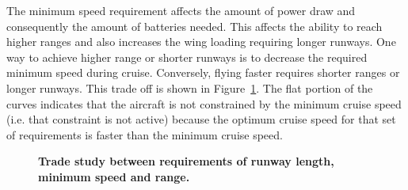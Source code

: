 \documentclass[]{aiaa-tc}%
\begin{document}
The minimum speed requirement affects the amount of power draw and consequently the amount of batteries needed.  
This affects the ability to reach higher ranges and also increases the wing loading requiring longer runways.  
One way to achieve higher range or shorter runways is to decrease the required minimum speed during cruise.  
Conversely, flying faster requires shorter ranges or longer runways.
This trade off is shown in Figure~\ref{f:minspeed}.
The flat portion of the curves indicates that the aircraft is not constrained by the minimum cruise speed (i.e. that constraint is not active) because the optimum cruise speed for that set of requirements is faster than the minimum cruise speed. 

\begin{figure}[h!]
 \begin{subfigmatrix}{2}%
 \end{subfigmatrix}
 \caption{\textbf{Trade study between requirements of runway length, minimum speed and range.}}
 \label{f:minspeed}
\end{figure}
\end{document}
